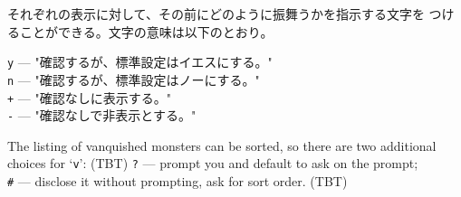 それぞれの表示に対して、その前にどのように振舞うかを指示する文字を
つけることができる。文字の意味は以下のとおり。

{\tt y} --- "確認するが、標準設定はイエスにする。"\\
{\tt n} --- "確認するが、標準設定はノーにする。"\\
{\tt +} --- "確認なしに表示する。"\\
{\tt -} --- "確認なしで非表示とする。"

The listing of vanquished monsters can be sorted,
so there are two additional choices for `{\tt v}':
(TBT)
{\tt ?} --- prompt you and default to ask on the prompt;\\
{\tt\#} --- disclose it without prompting, ask for sort order.
(TBT)

